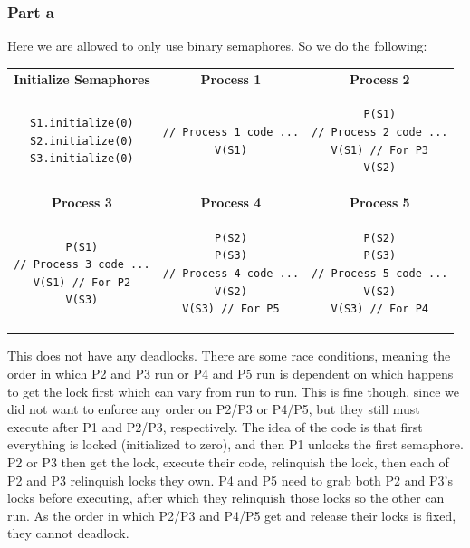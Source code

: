 \documentclass[english]{article}
\begin{document}
\subsubsection*{Part a}
Here we are allowed to only use binary semaphores. So we do the following:
\begin{table}[H]
\begin{tabular}{|c|c|c|}
\hline
\textbf{Initialize Semaphores} & \textbf{Process 1} & \textbf{Process 2}  \\

\begin{lstlisting}
S1.initialize(0)
S2.initialize(0)
S3.initialize(0)
\end{lstlisting}
 & 
 \begin{lstlisting}
// Process 1 code ...
V(S1)
\end{lstlisting}
& 
\begin{lstlisting}
P(S1)
// Process 2 code ...
V(S1) // For P3
V(S2)
\end{lstlisting} \\ \hline \hline
\textbf{Process 3} & \textbf{Process 4} & \textbf{Process 5} \\

\begin{lstlisting}
P(S1)
// Process 3 code ...
V(S1) // For P2
V(S3)
\end{lstlisting}
& 
\begin{lstlisting}
P(S2)
P(S3)
// Process 4 code ...
V(S2)
V(S3) // For P5
\end{lstlisting}
&
\begin{lstlisting}
P(S2)
P(S3)
// Process 5 code ...
V(S2)
V(S3) // For P4
\end{lstlisting} \\\hline

\end{tabular}
\end{table}

This does not have any deadlocks. There are some race conditions, meaning the order in which P2 and P3 run or P4 and P5 run is dependent on which
happens to get the lock first which can vary from run to run. This is fine though, since we did not want to enforce any order on P2/P3 or P4/P5,
but they still must execute after P1 and P2/P3, respectively. The idea of the code is that first everything is locked (initialized to zero), and
then P1 unlocks the first semaphore. P2 or P3 then get the lock, execute their code, relinquish the lock, then each of P2 and P3 relinquish locks
they own. P4 and P5 need to grab both P2 and P3's locks before executing, after which they relinquish those locks so the other can run. As the 
order in which P2/P3 and P4/P5 get and release their locks is fixed, they cannot deadlock.
\end{document}
